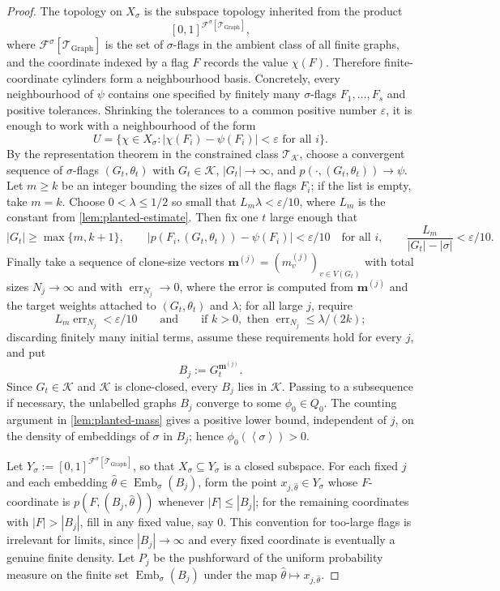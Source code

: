 \documentclass[11pt]{article}
\theoremstyle{definition}
\newcommand{\F}{\mathcal{F}}
\newcommand{\K}{\mathcal{K}}
\newcommand{\T}{\mathcal{T}}
\newcommand{\Emb}{\operatorname{Emb}}
\newcommand{\brak}[1]{\left\langle #1\right\rangle}
\newcommand{\eps}{\varepsilon}
\begin{document}
\begin{proof}
The topology on $X_\sigma$ is the subspace topology inherited from the product
\[
  [0,1]^{\F^\sigma[\T_{\mathrm{Graph}}]},
\]
where $\F^\sigma[\T_{\mathrm{Graph}}]$ is the set of $\sigma$-flags in the
ambient class of all finite graphs, and the coordinate indexed by a flag $F$
records the value $\chi(F)$.
Therefore finite-coordinate cylinders form a neighbourhood basis.  Concretely,
every neighbourhood of $\psi$ contains one specified by finitely many
$\sigma$-flags $F_1,\ldots,F_s$ and positive tolerances.  Shrinking the tolerances
to a common positive number $\eps$, it is enough to work with a neighbourhood of the form
\[
  U=
  \{\chi\in X_\sigma:
    |\chi(F_i)-\psi(F_i)|<\eps\text{ for all }i\}.
\]
By the representation theorem in the constrained class $\T_\K$, choose a
convergent sequence of $\sigma$-flags
$(G_t,\theta_t)$ with $G_t\in\K$, $|G_t|\to\infty$, and
$p(\cdot,(G_t,\theta_t))\to\psi$.  Let $m\ge k$ be an integer bounding the sizes
of all the flags $F_i$; if the list is empty, take $m=k$.
Choose $0<\lambda\le 1/2$ so small that $L_m\lambda<\eps/10$, where $L_m$ is the
constant from \cref{lem:planted-estimate}.  Then fix one $t$ large enough that
\[
  |G_t|\ge\max\{m,k+1\},
  \qquad
  |p(F_i,(G_t,\theta_t))-\psi(F_i)|<\eps/10
  \quad\text{for all }i,
  \qquad
  \frac{L_m}{|G_t|-|\sigma|}<\eps/10.
\]
Finally take a sequence of clone-size vectors
$\mathbf m^{(j)}=(m^{(j)}_v)_{v\in V(G_t)}$ with total sizes $N_j\to\infty$
and with $\operatorname{err}_{N_j}\to0$, where the error is computed from
$\mathbf m^{(j)}$ and the target weights attached to $(G_t,\theta_t)$ and
$\lambda$; for all large $j$, require
\[
  L_m\operatorname{err}_{N_j}<\eps/10
  \qquad
  \text{and}
  \qquad 
  \text{if }k>0,\text{ then } \operatorname{err}_{N_j}\le\lambda/(2k);
\]
discarding finitely many initial terms, assume these requirements hold for every
$j$, and put
\[
  B_j:=G_t^{\mathbf m^{(j)}}.
\]
Since $G_t\in\K$ and $\K$ is clone-closed, every $B_j$ lies in $\K$.  Passing to
a subsequence if necessary, the unlabelled graphs $B_j$ converge to some
$\phi_0\in Q_0$.  The counting argument in \cref{lem:planted-mass} gives a positive
lower bound, independent of $j$, on the density of embeddings of $\sigma$ in $B_j$;
hence $\phi_0(\brak\sigma)>0$.

Let $Y_\sigma:=[0,1]^{\F^\sigma[\T_{\mathrm{Graph}}]}$, so that
$X_\sigma\subseteq Y_\sigma$ is a closed subspace.  For each fixed $j$ and each
embedding $\widehat\theta\in\Emb_\sigma(B_j)$, form the point
$x_{j,\widehat\theta}\in Y_\sigma$ whose $F$-coordinate is
$p(F,(B_j,\widehat\theta))$ whenever $|F|\le |B_j|$; for the remaining
coordinates with $|F|>|B_j|$, fill in any fixed value, say $0$.  This convention
for too-large flags is irrelevant for limits, since $|B_j|\to\infty$ and every
fixed coordinate is eventually a genuine finite density.  Let $P_j$ be the
pushforward of the uniform probability measure on the finite set
$\Emb_\sigma(B_j)$ under the map
$\widehat\theta\mapsto x_{j,\widehat\theta}$.


\end{proof}
\end{document}
